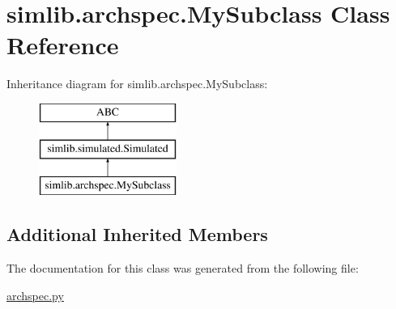 \hypertarget{classsimlib_1_1archspec_1_1_my_subclass}{}\section{simlib.\+archspec.\+My\+Subclass Class Reference}
\label{classsimlib_1_1archspec_1_1_my_subclass}
Inheritance diagram for simlib.\+archspec.\+My\+Subclass\+:\begin{figure}[H]
\begin{center}
\leavevmode
\includegraphics[height=3.000000cm]{classsimlib_1_1archspec_1_1_my_subclass}
\end{center}
\end{figure}
\subsection*{Additional Inherited Members}


The documentation for this class was generated from the following file\+:\begin{DoxyCompactItemize}
\item 
\mbox{\hyperlink{archspec_8py}{archspec.\+py}}\end{DoxyCompactItemize}
